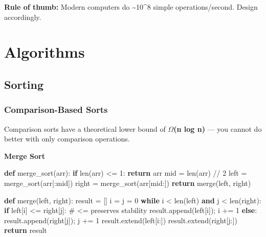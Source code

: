 \documentclass[11pt]{article}
\newenvironment{Shaded}{\begin{snugshade}}{\end{snugshade}}
\newcommand{\BuiltInTok}[1]{\textcolor[rgb]{0.50,0.55,0.55}{#1}}
\newcommand{\CommentTok}[1]{\textcolor[rgb]{0.48,0.49,0.49}{#1}}
\newcommand{\ControlFlowTok}[1]{\textcolor[rgb]{0.99,0.74,0.29}{\textbf{#1}}}
\newcommand{\DecValTok}[1]{\textcolor[rgb]{0.96,0.45,0.00}{#1}}
\newcommand{\KeywordTok}[1]{\textcolor[rgb]{0.81,0.81,0.76}{\textbf{#1}}}
\newcommand{\NormalTok}[1]{\textcolor[rgb]{0.81,0.81,0.76}{#1}}
\newcommand{\OperatorTok}[1]{\textcolor[rgb]{0.81,0.81,0.76}{#1}}
\begin{document}
\textbf{Rule of thumb:} Modern computers do \textasciitilde10\^{}8 simple operations/second. Design accordingly.

\section{Algorithms}\label{algorithms}

\subsection{Sorting}\label{sorting}


\subsubsection{Comparison-Based Sorts}\label{comparison-based-sorts}

Comparison sorts have a theoretical lower bound of \textbf{\(\Omega\)(n log n)} --- you cannot do better with only comparison operations.

\textbf{Merge Sort}


\begin{Shaded}
\begin{Highlighting}[]
\KeywordTok{def}\NormalTok{ merge\_sort(arr):}
    \ControlFlowTok{if} \BuiltInTok{len}\NormalTok{(arr) }\OperatorTok{\textless{}=} \DecValTok{1}\NormalTok{:}
        \ControlFlowTok{return}\NormalTok{ arr}
\NormalTok{    mid }\OperatorTok{=} \BuiltInTok{len}\NormalTok{(arr) }\OperatorTok{//} \DecValTok{2}
\NormalTok{    left }\OperatorTok{=}\NormalTok{ merge\_sort(arr[:mid])}
\NormalTok{    right }\OperatorTok{=}\NormalTok{ merge\_sort(arr[mid:])}
    \ControlFlowTok{return}\NormalTok{ merge(left, right)}

\KeywordTok{def}\NormalTok{ merge(left, right):}
\NormalTok{    result }\OperatorTok{=}\NormalTok{ []}
\NormalTok{    i }\OperatorTok{=}\NormalTok{ j }\OperatorTok{=} \DecValTok{0}
    \ControlFlowTok{while}\NormalTok{ i }\OperatorTok{\textless{}} \BuiltInTok{len}\NormalTok{(left) }\KeywordTok{and}\NormalTok{ j }\OperatorTok{\textless{}} \BuiltInTok{len}\NormalTok{(right):}
        \ControlFlowTok{if}\NormalTok{ left[i] }\OperatorTok{\textless{}=}\NormalTok{ right[j]:   }\CommentTok{\# \textless{}= preserves stability}
\NormalTok{            result.append(left[i])}\OperatorTok{;}\NormalTok{ i }\OperatorTok{+=} \DecValTok{1}
        \ControlFlowTok{else}\NormalTok{:}
\NormalTok{            result.append(right[j])}\OperatorTok{;}\NormalTok{ j }\OperatorTok{+=} \DecValTok{1}
\NormalTok{    result.extend(left[i:])}
\NormalTok{    result.extend(right[j:])}
    \ControlFlowTok{return}\NormalTok{ result}
\end{Highlighting}
\end{Shaded}
\end{document}
